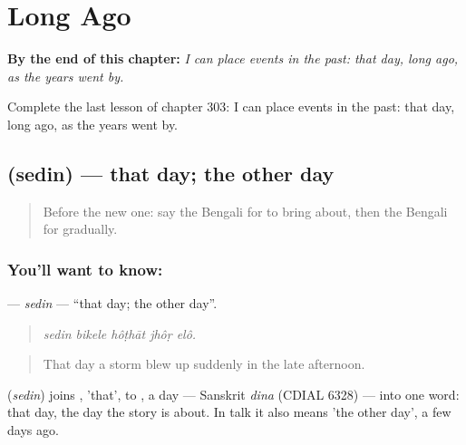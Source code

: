 
\chapter{Long Ago}
\label{ch:bn-long-ago}

\begin{chapteropening}
\textbf{By the end of this chapter:} \emph{I can place events in the past: that day, long ago, as the years went by.}

Complete the last lesson of chapter 303: I can place events in the past: that day, long ago, as the years went by.
\end{chapteropening}

\section[\texorpdfstring{\bn{সেদিন} (sedin)}{সেদিন (sedin)}]{ (sedin) — that day; the other day}

\label{lesson:BN-C303-sedin}



\begin{quote}
Before the new one: say the Bengali for to bring about, then the Bengali for gradually.
\end{quote}

\subsection*{You'll want to know: }
\textbf{} — \emph{sedin} — \textquotedblleft{}that day; the other day\textquotedblright{}.

\begin{quote}
    
\end{quote}

\begin{quote}
\emph{sedin bikele hôṭhāt jhôṛ elô.}
\end{quote}

\begin{quote}
That day a storm blew up suddenly in the late afternoon.
\end{quote}

\begin{cousinweb}
\textbf{} (\emph{sedin}) joins , 'that', to \textbf{}, a day — Sanskrit \emph{dina} (CDIAL 6328) — into one word: that day, the day the story is about. In talk it also means 'the other day', a few days ago.
\end{cousinweb}

